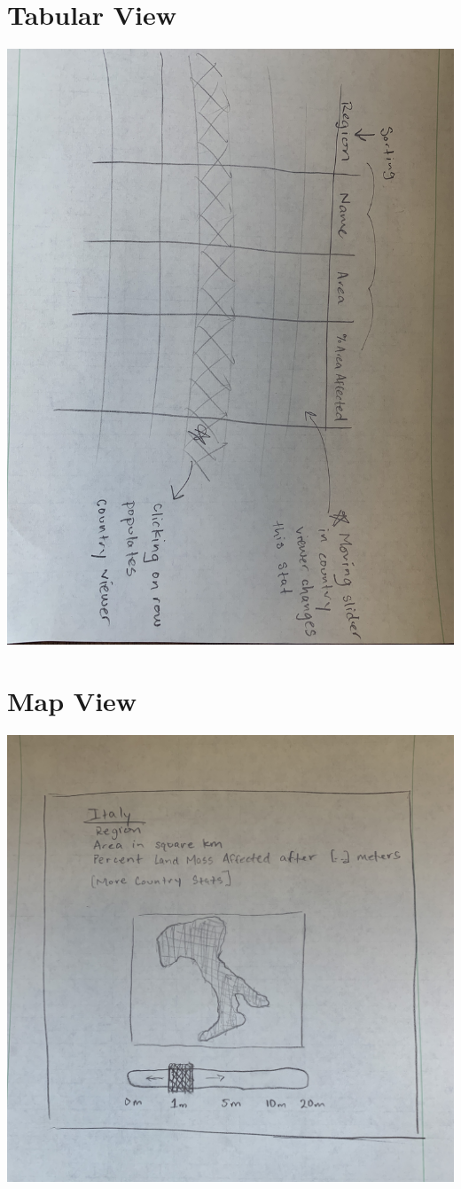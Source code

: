 \documentclass[12pt]{article}
\begin{document}
	\section{Tabular View}
		\includegraphics[scale=0.15]{figures/table-view.jpg}
	\section{Map View}
		\includegraphics[scale=0.15]{figures/country-view.jpg}
\end{document}
